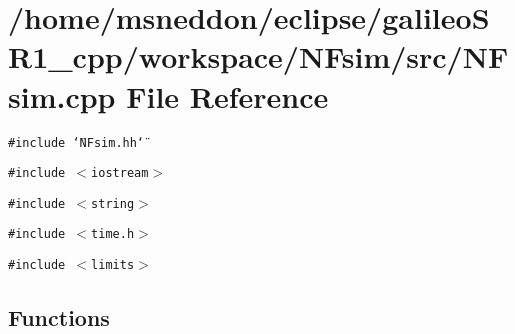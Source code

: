 \section{/home/msneddon/eclipse/galileoSR1\_\-cpp/workspace/NFsim/src/NFsim.cpp File Reference}
\label{NFsim_8cpp}


{\tt \#include \char`\"{}NFsim.hh\char`\"{}}\par
{\tt \#include $<$iostream$>$}\par
{\tt \#include $<$string$>$}\par
{\tt \#include $<$time.h$>$}\par
{\tt \#include $<$limits$>$}\par
\subsection*{Functions}
